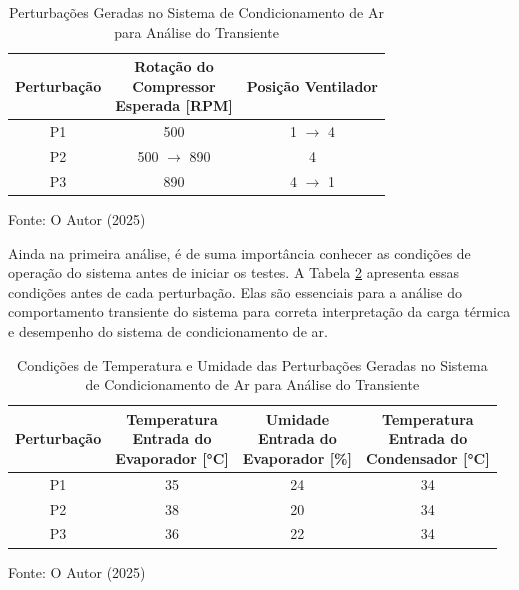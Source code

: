 \begin{table}[htb]
    \centering
\begin{tabular}{|c|c|c|}
    \hline
    \textbf{Perturbação} & 
    \makecell{\textbf{Rotação do} \\ \textbf{Compressor} \\ \textbf{Esperada [RPM]}} &
    \textbf{Posição Ventilador} \\
        \hline
        P1 & 500 & 1 $\rightarrow$ 4  \\
        P2 & 500 $\rightarrow$ 890 & 4  \\
        P3 & 890 & 4 $\rightarrow$ 1  \\
        \hline
    \end{tabular}
    \caption{Perturbações Geradas no Sistema de Condicionamento de Ar para Análise do Transiente}
    \vspace{5pt} 
{\footnotesize Fonte: O Autor (2025) }
    \label{tab:pertubaçõesTransiente}
\end{table}

Ainda na primeira análise, é de suma importância conhecer as condições de operação do sistema antes de iniciar os testes. A Tabela \ref{tab:pertubaçõesTransienteCondiçõesIniciais} apresenta essas condições antes de cada perturbação. Elas são essenciais para a análise do comportamento transiente do sistema para correta interpretação da carga térmica e desempenho do sistema de condicionamento de ar.


\begin{table}[htb]
    \centering
\begin{tabular}{|c|c|c|c|}
    \hline
    \textbf{Perturbação} & 
    \makecell{\textbf{Temperatura} \\ \textbf{Entrada do} \\ \textbf{Evaporador [°C]}} &
    \makecell{\textbf{Umidade} \\ \textbf{Entrada do} \\ \textbf{Evaporador [\%]}} &
    \makecell{\textbf{Temperatura} \\ \textbf{Entrada do} \\ \textbf{Condensador [°C]}} \\
        \hline
        P1 & 35 & 24 & 34 \\
        P2 & 38 & 20   & 34\\
        P3 & 36 & 22  & 34 \\
        \hline
    \end{tabular}
    \caption{Condições de Temperatura e Umidade das Perturbações Geradas no Sistema de Condicionamento de Ar para Análise do Transiente}
    \vspace{5pt} 
{\footnotesize Fonte: O Autor (2025) }
    \label{tab:pertubaçõesTransienteCondiçõesIniciais}
\end{table}

